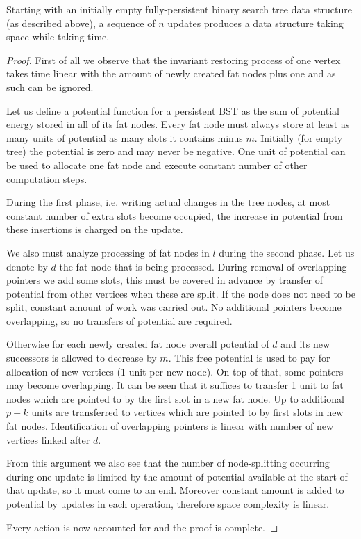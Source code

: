 \begin{prop}
Starting with an initially empty fully-persistent binary search tree data structure (as described above), a sequence of $n$ updates produces a data structure taking  space while taking  time.
\end{prop}

\begin{proof}
First of all we observe that the invariant restoring process of one vertex takes time linear with the amount of newly created fat nodes plus one and as such can be ignored.
	
Let us define a potential function for a persistent BST as the sum of potential energy stored in all of its fat nodes. 
Every fat node must always store at least as many units of potential as many slots it contains minus $m$. 
Initially (for empty tree) the potential is zero and may never be negative. One unit of potential can be used to allocate one fat node and execute constant number of other computation steps.

During the first phase, i.e. writing actual changes in the tree nodes, at most constant number of extra slots become occupied, the increase in potential from these insertions is charged on the update.

We also must analyze processing of fat nodes in $l$ during the second phase. Let us denote by $d$ the fat node that is being processed. 
During removal of overlapping pointers we add some slots, this must be covered in advance by transfer of potential from other vertices when these are split. 
If the node does not need to be split, constant amount of work was carried out. 
No additional pointers become overlapping, so no transfers of potential are required.

Otherwise for each newly created fat node overall potential of $d$ and its new successors is allowed to decrease by $m$.
This free potential is used to pay for allocation of new vertices (1 unit per new node). 
On top of that, some pointers may become overlapping. It can be seen that it suffices to transfer 1 unit to fat nodes which are pointed to by the first slot in a new fat node. Up to additional $p+k$ units are transferred to vertices which are pointed to by first slots in new fat nodes.
Identification of overlapping pointers is linear with number of new vertices linked after $d$.

From this argument we also see that the number of node-splitting occurring during one update is limited by the amount of potential available at the start of that update, so it must come to an end. Moreover constant amount is added to potential by updates in each operation, therefore space complexity is linear.

Every action is now accounted for and the proof is complete.
\end{proof}

